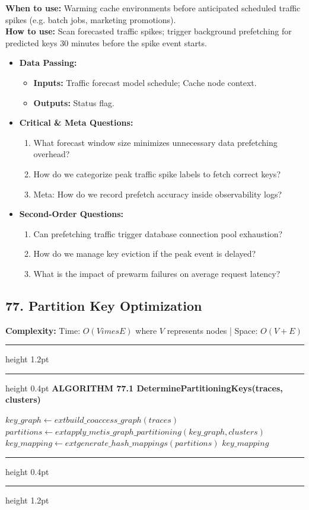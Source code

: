 \documentclass[11pt,a4paper]{article}
\newenvironment{textbookalgo}[2]{%
  \par\addvspace{1.2em}\noindent
  \hrule height 1.2pt
  \vspace{1.5pt}
  \hrule height 0.4pt
  \vspace{5pt}
  {\noindent\large\bfseries\sffamily ALGORITHM #1 \quad #2}
  \par\vspace{5pt}
  \RestyleAlgo{plain}
}{%
  \par\vspace{4pt}
  \hrule height 0.4pt
  \vspace{1.5pt}
  \hrule height 1.2pt
  \par\addvspace{1.2em}
}
\theoremstyle{definition}
\begin{document}
\noindent
\textbf{When to use:} Warming cache environments before anticipated scheduled traffic spikes (e.g. batch jobs, marketing promotions).\\
\textbf{How to use:} Scan forecasted traffic spikes; trigger background prefetching for predicted keys 30 minutes before the spike event starts.
\begin{itemize}[leftmargin=*]
  \item[] \textbf{Data Passing:}
    \begin{itemize}
      \item \textbf{Inputs:} Traffic forecast model schedule; Cache node context.
      \item \textbf{Outputs:} Status flag.
    \end{itemize}
  \item[] \textbf{Critical \& Meta Questions:}
  \begin{enumerate}
    \item What forecast window size minimizes unnecessary data prefetching overhead?
    \item How do we categorize peak traffic spike labels to fetch correct keys?
    \item Meta: How do we record prefetch accuracy inside observability logs?
  \end{enumerate}
  \item[] \textbf{Second-Order Questions:}
  \begin{enumerate}
    \item Can prefetching traffic trigger database connection pool exhaustion?
    \item How do we manage key eviction if the peak event is delayed?
    \item What is the impact of prewarm failures on average request latency?
  \end{enumerate}
\end{itemize}
\medskip

\clearpage
\subsection{77. Partition Key Optimization}


\noindent
\textbf{Complexity:} Time: $O(V 	imes E)$ where $V$ represents nodes | Space: $O(V + E)$
\smallskip

\begin{textbookalgo}{77.1}{DeterminePartitioningKeys(traces, clusters)}
\begin{algorithm}[H]
$key\_graph \leftarrow 	ext{build\_coaccess\_graph}(traces)$\;
$partitions \leftarrow 	ext{apply\_metis\_graph\_partitioning}(key\_graph, clusters)$\;
$key\_mapping \leftarrow 	ext{generate\_hash\_mappings}(partitions)$\;
\Return $key\_mapping$\;
\end{algorithm}
\end{textbookalgo}
\end{document}
